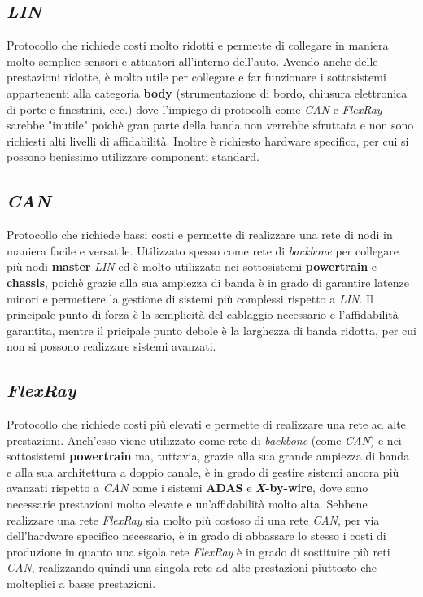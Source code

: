 \subsection{\emph{LIN}}
Protocollo che richiede costi molto ridotti e permette di collegare in maniera molto semplice sensori e attuatori all'interno dell'auto. Avendo anche delle prestazioni ridotte, è molto utile per collegare e far funzionare i sottosistemi appartenenti alla categoria \textbf{body} (strumentazione di bordo, chiusura elettronica di porte e finestrini, ecc.) dove l'impiego di protocolli come \emph{CAN} e \emph{FlexRay} sarebbe "inutile" poichè gran parte della banda non verrebbe sfruttata e non sono richiesti alti livelli di affidabilità. Inoltre è richiesto hardware specifico, per cui si possono benissimo utilizzare componenti standard. \cite{huang_2019_invehicle}

\subsection{\emph{CAN}}
Protocollo che richiede bassi costi e permette di realizzare una rete di nodi in maniera facile e versatile. Utilizzato spesso come rete di \emph{backbone} per collegare più nodi \textbf{master} \emph{LIN} ed è molto utilizzato nei sottosistemi \textbf{powertrain} e \textbf{chassis}, poichè grazie alla sua ampiezza di banda è in grado di garantire latenze minori e permettere la gestione di sistemi più complessi rispetto a \emph{LIN}. Il principale punto di forza è la semplicità del cablaggio necessario e l'affidabilità garantita, mentre il pricipale punto debole è la larghezza di banda ridotta, per cui non si possono realizzare sistemi avanzati. \cite{huang_2019_invehicle}
\subsection{\emph{FlexRay}}
Protocollo che richiede costi più elevati e permette di realizzare una rete ad alte prestazioni. Anch'esso viene utilizzato come rete di \emph{backbone} (come \emph{CAN}) e nei sottosistemi \textbf{powertrain} ma, tuttavia, grazie alla sua grande ampiezza di banda e alla sua architettura a doppio canale, è in grado di gestire sistemi ancora più avanzati rispetto a \emph{CAN} come i sistemi \textbf{ADAS} e \textbf{\emph{X}-by-wire}, dove sono necessarie prestazioni molto elevate e un'affidabilità molto alta. Sebbene realizzare una rete \emph{FlexRay} sia molto più costoso di una rete \emph{CAN}, per via dell'hardware specifico necessario, è in grado di abbassare lo stesso i costi di produzione in quanto una sigola rete \emph{FlexRay} è in grado di sostituire più reti \emph{CAN}, realizzando quindi una singola rete ad alte prestazioni piuttosto che molteplici a basse prestazioni. \cite{huang_2019_invehicle}

\newpage
